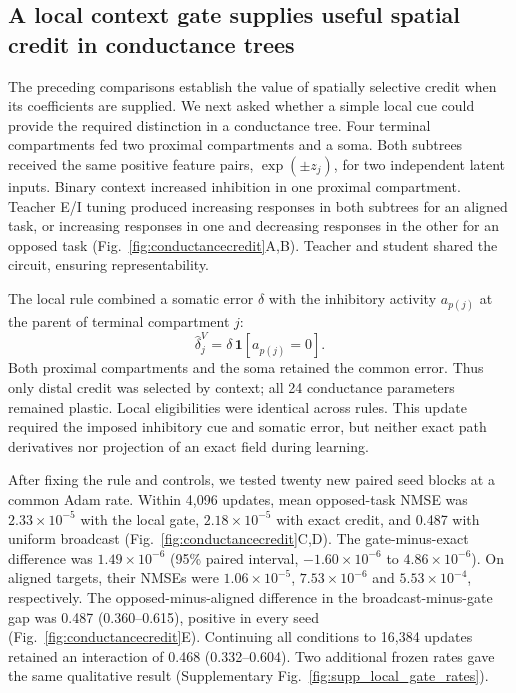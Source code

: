 \subsection*{A local context gate supplies useful spatial credit in conductance trees}

The preceding comparisons establish the value of spatially selective credit when its coefficients are supplied. We next asked whether a simple local cue could provide the required distinction in a conductance tree. Four terminal compartments fed two proximal compartments and a soma. Both subtrees received the same positive feature pairs, $\exp(\pm z_j)$, for two independent latent inputs. Binary context increased inhibition in one proximal compartment. Teacher E/I tuning produced increasing responses in both subtrees for an aligned task, or increasing responses in one and decreasing responses in the other for an opposed task (Fig.~\ref{fig:conductancecredit}A,B). Teacher and student shared the circuit, ensuring representability.

The local rule combined a somatic error $\delta$ with the inhibitory activity $a_{p(j)}$ at the parent of terminal compartment $j$:
\begin{equation}
\widehat\delta_j^V=\delta\,\mathbf1[a_{p(j)}=0].
\label{eq:localconductancegate}
\end{equation}
Both proximal compartments and the soma retained the common error. Thus only distal credit was selected by context; all 24 conductance parameters remained plastic. Local eligibilities were identical across rules. This update required the imposed inhibitory cue and somatic error, but neither exact path derivatives nor projection of an exact field during learning.

After fixing the rule and controls, we tested twenty new paired seed blocks at a common Adam rate. Within 4,096 updates, mean opposed-task NMSE was $2.33\times10^{-5}$ with the local gate, $2.18\times10^{-5}$ with exact credit, and 0.487 with uniform broadcast (Fig.~\ref{fig:conductancecredit}C,D). The gate-minus-exact difference was $1.49\times10^{-6}$ (95\% paired interval, $-1.60\times10^{-6}$ to $4.86\times10^{-6}$). On aligned targets, their NMSEs were $1.06\times10^{-5}$, $7.53\times10^{-6}$ and $5.53\times10^{-4}$, respectively. The opposed-minus-aligned difference in the broadcast-minus-gate gap was 0.487 (0.360--0.615), positive in every seed (Fig.~\ref{fig:conductancecredit}E). Continuing all conditions to 16,384 updates retained an interaction of 0.468 (0.332--0.604). Two additional frozen rates gave the same qualitative result (Supplementary Fig.~\ref{fig:supp_local_gate_rates}).

